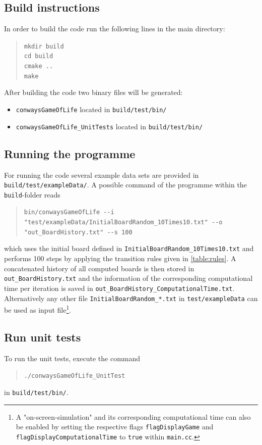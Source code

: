 \subsection{Build instructions}
In order to build the code run the following lines in the main directory:
\begin{quote}
	\texttt{mkdir build}\\
	\texttt{cd build}\\
	\texttt{cmake ..}\\
	\texttt{make}
\end{quote}
After building the code two binary files will be generated:
\begin{itemize}
	\item \texttt{conwaysGameOfLife} located in \texttt{build/test/bin/}
	\item \texttt{conwaysGameOfLife\_UnitTests} located in \texttt{build/test/bin/}
\end{itemize}


\subsection{Running the programme}
For running the code several example data sets are provided in \texttt{build/test/exampleData/}.
A possible command of the programme within the \texttt{build}-folder reads
\begin{quote}
	\texttt{bin/conwaysGameOfLife -{}-i "test/exampleData/InitialBoardRandom\_10Times10.txt" -{}-o "out\_BoardHistory.txt" -{}-s 100}
\end{quote}
which uses the initial board defined in \texttt{InitialBoardRandom\_10Times10.txt} and performs 100 steps by applying the transition rules given in \cref{table:rules}. A concatenated history of all computed boards is then stored in \texttt{out\_BoardHistory.txt} and the information of the corresponding computational time per iteration is saved in \texttt{out\_BoardHistory\_ComputationalTime.txt}.
Alternatively any other file \texttt{InitialBoardRandom\_*.txt} in \texttt{test/exampleData} can be used as input file\footnote{A "on-screen-simulation" and its corresponding computational time can also be enabled by setting the respective flags \texttt{flagDisplayGame} and \texttt{flagDisplayComputationalTime} to \texttt{true} within \texttt{main.cc}.}.

\subsection{Run unit tests}
To run the unit tests, execute the command
\begin{quote}
	\texttt{./conwaysGameOfLife\_UnitTest}
\end{quote}
in \texttt{build/test/bin/}.


